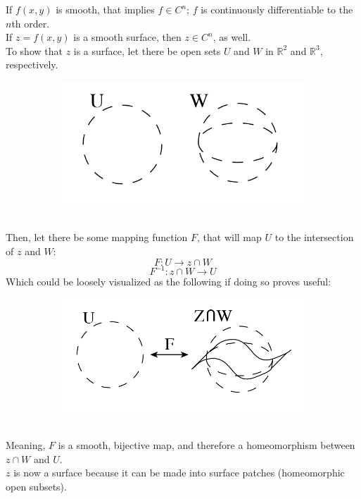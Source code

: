 \documentclass[12pt]{article}
\begin{document}
If $f(x,y)$ is smooth, that implies $f \in C^n$; $f$ is continuously differentiable to the $n$th order.\\
If $z = f(x,y)$ is a smooth surface, then $z \in C^n$, as well.\\
\indent
To show that $z$ is a surface, let there be open sets $U$ and $W$ in $\mathbb{R}^2$ and $\mathbb{R}^3$, respectively.\\
\begin{figure}[h!]
  \centering
      \begin{subfigure}[b]{0.5\linewidth}
    \includegraphics[width=\linewidth]{./assets/4-2-1/u-and-w.png}
  \end{subfigure}
  \end{figure}
  \\
  \clearpage
Then, let there be some mapping function $F$, that will map $U$ to the intersection of $z$ and $W$:\\
$$
F: U \rightarrow z \cap W
$$
$$
F^{-1}: z \cap W \rightarrow U
$$
Which could be loosely visualized as the following if doing so proves useful:\\
\begin{figure}[h!]
  \centering
      \begin{subfigure}[b]{0.5\linewidth}
    \includegraphics[width=\linewidth]{./assets/4-2-1/u-and-w-mapping.png}
  \end{subfigure}
  \end{figure}
  \\
\indent
Meaning, $F$ is a smooth, bijective map, and therefore a homeomorphism between $z \cap W$ and $U$.\\
\indent
$z$ is now a surface because it can be made into surface patches (homeomorphic open subsets).\\
\end{document}
